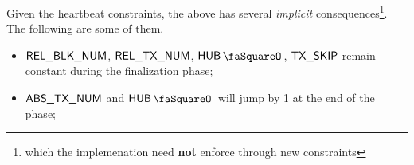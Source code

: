 \saNote{} Given the heartbeat constraints, the above has several \emph{implicit} consequences\footnote{which the implemenation need \textbf{not} enforce through new constraints}. The following are some of them.
\begin{itemize}
	\item $\textsf{REL\_BLK\_NUM}$, $\textsf{REL\_TX\_NUM}$, $\hubStamp$, $\textsf{TX}\textsf{\_SKIP}$ remain constant during the finalization phase;
	\item $\textsf{ABS\_TX\_NUM}$ and $\hubStamp$ will jump by 1 at the end of the phase;
\end{itemize}
